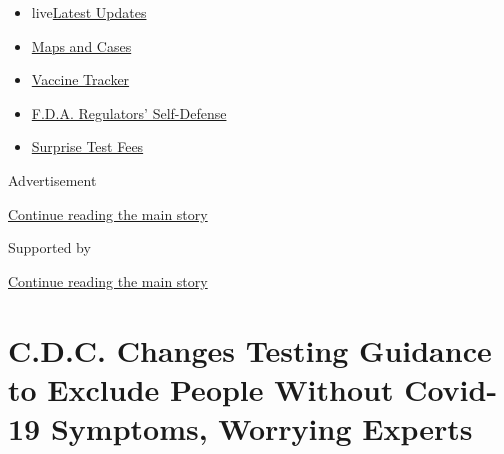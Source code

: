 \begin{itemize}
\tightlist
\item
  live\href{https://www.nytimes3xbfgragh.onion/2020/09/11/world/covid-19-coronavirus.html?name=styln-coronavirus-national\&region=TOP_BANNER\&block=storyline_menu_recirc\&action=click\&pgtype=Article\&impression_id=e1bcedc1-f4b3-11ea-8aa9-63c77993ef22\&variant=undefined}{Latest
  Updates}
\item
  \href{https://www.nytimes3xbfgragh.onion/interactive/2020/us/coronavirus-us-cases.html?name=styln-coronavirus-national\&region=TOP_BANNER\&block=storyline_menu_recirc\&action=click\&pgtype=Article\&impression_id=e1bd14d0-f4b3-11ea-8aa9-63c77993ef22\&variant=undefined}{Maps
  and Cases}
\item
  \href{https://www.nytimes3xbfgragh.onion/interactive/2020/science/coronavirus-vaccine-tracker.html?name=styln-coronavirus-national\&region=TOP_BANNER\&block=storyline_menu_recirc\&action=click\&pgtype=Article\&impression_id=e1c35660-f4b3-11ea-8aa9-63c77993ef22\&variant=undefined}{Vaccine
  Tracker}
\item
  \href{https://www.nytimes3xbfgragh.onion/2020/09/10/us/politics/fda-coronavirus-vaccine.html?name=styln-coronavirus-national\&region=TOP_BANNER\&block=storyline_menu_recirc\&action=click\&pgtype=Article\&impression_id=e1c35661-f4b3-11ea-8aa9-63c77993ef22\&variant=undefined}{F.D.A.
  Regulators' Self-Defense}
\item
  \href{https://www.nytimes3xbfgragh.onion/2020/09/09/upshot/coronavirus-surprise-test-fees.html?name=styln-coronavirus-national\&region=TOP_BANNER\&block=storyline_menu_recirc\&action=click\&pgtype=Article\&impression_id=e1c37d70-f4b3-11ea-8aa9-63c77993ef22\&variant=undefined}{Surprise
  Test Fees}
\end{itemize}

Advertisement

\protect\hyperlink{after-top}{Continue reading the main story}

Supported by

\protect\hyperlink{after-sponsor}{Continue reading the main story}

\hypertarget{cdc-changes-testing-guidance-to-exclude-people-without-covid-19-symptoms-worrying-experts}{%
\section{C.D.C. Changes Testing Guidance to Exclude People Without
Covid-19 Symptoms, Worrying
Experts}\label{cdc-changes-testing-guidance-to-exclude-people-without-covid-19-symptoms-worrying-experts}}


